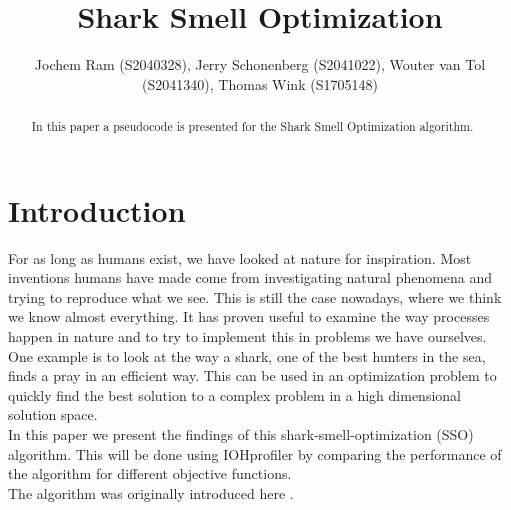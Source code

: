 \documentclass[runningheads]{llncs}
\begin{document}
%
\title{Shark Smell Optimization}
%
%
\author{Jochem Ram (S2040328), Jerry Schonenberg (S2041022), Wouter van Tol (S2041340), Thomas Wink (S1705148)}
%
%
%
\maketitle              %
%
\begin{abstract}
In this paper a pseudocode is presented for the Shark Smell Optimization algorithm.
\end{abstract}





\section{Introduction}
For as long as humans exist, we have looked at nature for inspiration. Most inventions humans have made come from investigating natural phenomena and trying to reproduce what we see. This is still the case nowadays, where we think we know almost everything. It has proven useful to examine the way processes happen in nature and to try to implement this in problems we have ourselves. One example is to look at the way a shark, one of the best hunters in the sea, finds a pray in an efficient way. This can be used in an optimization problem to quickly find the best solution to a complex problem in a high dimensional solution space.\\
In this paper we present the findings of this shark-smell-optimization (SSO) algorithm. This will be done using IOHprofiler by comparing the performance of the algorithm for different objective functions.\\
The algorithm was originally introduced here \cite{abedinia2014shark}.
\end{document}
